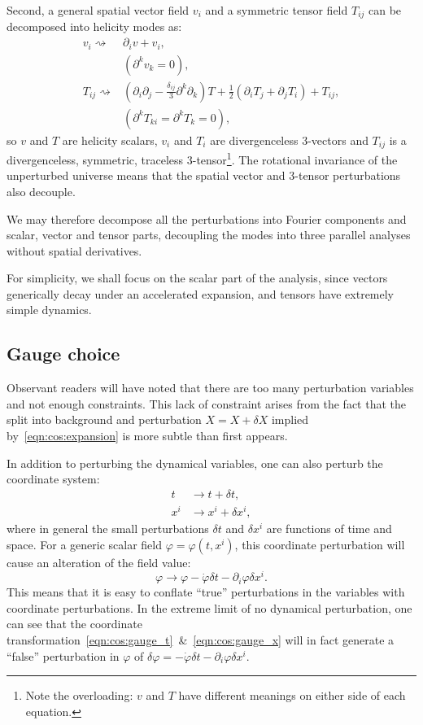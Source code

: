 Second, a general spatial vector field \(v_i\) and a symmetric tensor field \(T_{ij}\) can be decomposed into helicity modes as:
\begin{align}
  v_i \rightsquigarrow& \partial_i v + v_i,   \nonumber\\
  &(\partial^k v_k=0), \\
  T_{ij} \rightsquigarrow& (\partial_i\partial_j - \frac{\delta_{ij}}{3}\partial^k\partial_k)T + \frac{1}{2}(\partial_i T_j + \partial_j T_i) + T_{ij} \nonumber,\\ 
  &(\partial^k T_{ki} = \partial^k T_k = 0),
\end{align}
so \(v\) and \(T\) are helicity scalars, \(v_i\) and \(T_i\) are divergenceless 3-vectors and \(T_{ij}\) is a divergenceless, symmetric, traceless 3-tensor\footnote{Note the overloading: \(v\) and \(T\) have different meanings on either side of each equation.}.
  The rotational invariance of the unperturbed universe means that the spatial vector and 3-tensor perturbations also decouple.

We may therefore decompose all the perturbations into Fourier components and scalar, vector and tensor parts, decoupling the modes into three parallel analyses without spatial derivatives.

For simplicity, we shall focus on the scalar part of the analysis, since vectors generically decay under an accelerated expansion, and tensors have extremely simple dynamics.

\subsection{Gauge choice}
Observant readers will have noted that there are too many perturbation variables and not enough constraints.
This lack of constraint arises from the fact that the split into background and perturbation \(X=X+\delta X\) implied by~\eqref{eqn:cos:expansion} is more subtle than first appears. 

In addition to perturbing the dynamical variables, one can also perturb the coordinate system:
\begin{align}
  t &\rightarrow t + \delta t,
  \label{eqn:cos:gauge_t}
  \\
  x^i &\rightarrow x^i  + \delta x^i,
  \label{eqn:cos:gauge_x}
\end{align}
where in general the small perturbations \(\delta t\) and \(\delta x^i\) are functions of time and space.
For a generic scalar field \(\varphi = \varphi(t,x^i)\), this coordinate perturbation will cause an alteration of the field value:
\begin{equation}
  \varphi \rightarrow \varphi - \dot{\varphi}\delta t - \partial_i\varphi\delta x^i.
\end{equation}
This means that it is easy to conflate ``true'' perturbations in the variables with coordinate perturbations. In the extreme limit of no dynamical perturbation, one can see that the coordinate transformation~\eqref{eqn:cos:gauge_t}~\&~\eqref{eqn:cos:gauge_x} will in fact generate a ``false'' perturbation in \(\varphi\) of \(\delta\varphi = -\dot{\varphi}\delta t - \partial_i\varphi\delta x^i\).

